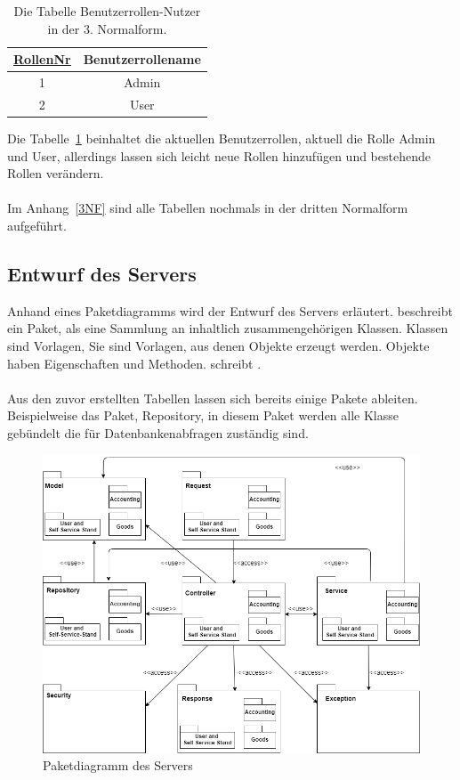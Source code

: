 \begin{table}[H]
	\centering
	\begin{tabular}{|c|c|}
		\hline
		\underline{\underline{RollenNr}} & Benutzerrollename \\
		\hline
		1 & Admin  \\
		\hline
		2 & User \\
		\hline
	\end{tabular}
	\caption{Die Tabelle Benutzerrollen-Nutzer in der 3. Normalform.}
	\label{tab: Benutzerrolle 3.NF}
\end{table}

Die Tabelle~\ref{tab: Benutzerrolle 3.NF} beinhaltet die aktuellen Benutzerrollen, aktuell die Rolle Admin und User, allerdings lassen sich leicht neue Rollen hinzufügen und bestehende Rollen verändern. 
\\
\\
Im Anhang~\ref{3NF} sind alle Tabellen nochmals in der dritten Normalform aufgeführt.


\subsection{Entwurf des Servers}\label{entwurf_des_Serversr}

Anhand eines Paketdiagramms wird der Entwurf des Servers erläutert.
\cite{Server1} beschreibt ein Paket, als eine Sammlung an inhaltlich zusammengehörigen Klassen. Klassen sind Vorlagen, \glqq Sie sind Vorlagen, aus denen Objekte erzeugt werden. Objekte haben Eigenschaften und Methoden.\grqq{} schreibt \cite{Server2}.
\\
\\
Aus den zuvor erstellten Tabellen lassen sich bereits einige Pakete ableiten. Beispielweise das Paket, Repository, in diesem Paket werden alle Klasse gebündelt die für Datenbankenabfragen zuständig sind. 

\begin{figure}[htb]
	\centering
	\includegraphics[width=1\textwidth,angle=0]{abb/Paketdiagramm}
	\caption[Paketdiagramm des Servers]{Paketdiagramm des Servers}
	\label{fig:AB_Paketdiagramm_Server}
\end{figure}


